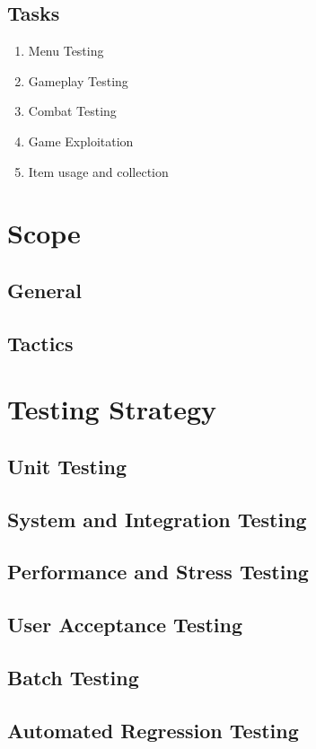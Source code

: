 \documentclass[a4paper, 10pt]{article}
\begin{document}
    \subsection{Tasks}
        \begin{enumerate}
        \item Menu Testing
        \item Gameplay Testing
        \item Combat Testing
        \item Game Exploitation
        \item Item usage and collection
    \end{enumerate}
    

\section{Scope}
    \subsection{General}
    \subsection{Tactics}

\section{Testing Strategy}
    \subsection{Unit Testing}
    \subsection{System and Integration Testing}
    \subsection{Performance and Stress Testing}
    \subsection{User Acceptance Testing}
    \subsection{Batch Testing}
    \subsection{Automated Regression Testing}
\end{document}
